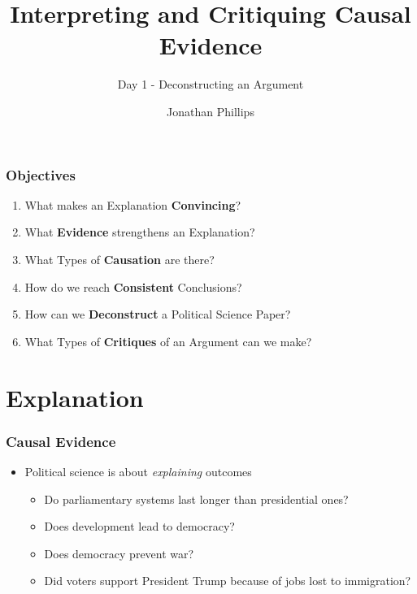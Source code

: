 \documentclass[xcolor=x11names,compress]{beamer}\usepackage[]{graphicx}\usepackage[]{xcolor}
\title{Interpreting and Critiquing Causal Evidence}
\subtitle{Day 1 - Deconstructing an Argument}
\author{Jonathan Phillips}
\renewcommand{\(}{\begin{columns}}
\renewcommand{\)}{\end{columns}}
\newcommand{\<}[1]{\begin{column}{#1}}
\renewcommand{\>}{\end{column}}
\begin{document}
\frame{\titlepage}

\begin{frame}
\frametitle{Objectives}
\begin{enumerate}
\item What makes an Explanation \textbf{Convincing}?
\pause
\item What \textbf{Evidence} strengthens an Explanation?
\pause
\item What Types of \textbf{Causation} are there?
\pause
\item How do we reach \textbf{Consistent} Conclusions?
\pause
\item How can we \textbf{Deconstruct} a Political Science Paper?
\pause
\item What Types of \textbf{Critiques} of an Argument can we make?
\end{enumerate}
\end{frame}

\section{Explanation}

\begin{frame}
\frametitle{Causal Evidence}
\begin{itemize}
\item Political science is about \textit{explaining} outcomes
\pause
\begin{itemize}
\item Do parliamentary systems last longer than presidential ones?
\pause
\item Does development lead to democracy?
\pause
\item Does democracy prevent war?
\pause
\item Did voters support President Trump because of jobs lost to immigration?
\end{itemize}
\end{itemize}

\end{frame}
\end{document}
